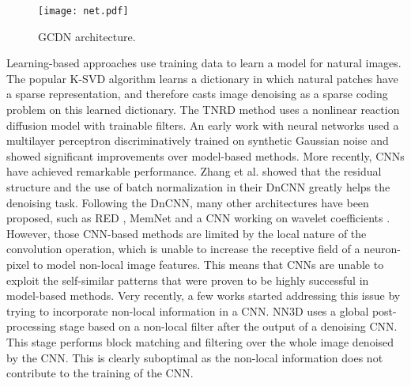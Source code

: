\documentclass[journal]{IEEEtran}
\begin{document}
\begin{figure*}
    \centering
    \texttt{[image: net.pdf]}
    \caption{GCDN architecture.}
    \label{fig:net}
\end{figure*}
Learning-based approaches use training data to learn a model for natural images. The popular K-SVD algorithm \cite{elad2006image} learns a dictionary in which natural patches have a sparse representation, and therefore casts image denoising as a sparse coding problem on this learned dictionary. The TNRD method \cite{chen2016trainable} uses a nonlinear reaction diffusion model with trainable filters. An early work with neural networks \cite{burger2012image} used a multilayer perceptron discriminatively trained on synthetic Gaussian noise and showed significant improvements over model-based methods. More recently, CNNs have achieved remarkable performance. Zhang et al. \cite{zhang2017beyond} showed that the residual structure and the use of batch normalization \cite{ioffe2015batchnorm} in their DnCNN greatly helps the denoising task. Following the DnCNN, many other architectures have been proposed, such as RED \cite{mao2016image}, MemNet \cite{tai2017memnet} and a CNN working on wavelet coefficients \cite{bae2017beyond}. However, those CNN-based methods are limited by the local nature of the convolution operation, which is unable to increase the receptive field of a neuron-pixel to model non-local image features. This means that CNNs are unable to exploit the self-similar patterns that were proven to be highly successful in model-based methods. Very recently, a few works started addressing this issue by trying to incorporate non-local information in a CNN. NN3D \cite{cruz2018nonlocality} uses a global post-processing stage based on a non-local filter after the output of a denoising CNN. This stage performs block matching and filtering over the whole image denoised by the CNN. This is clearly suboptimal as the non-local information does not contribute to the training of the CNN. 
\end{document}
